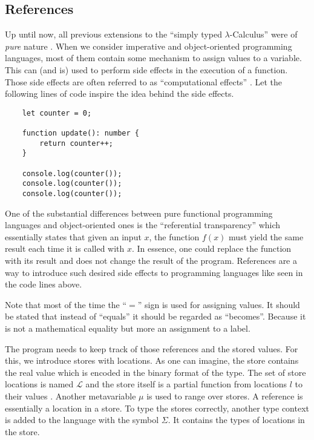 \subsection{References}

Up until now, all previous extensions to the ``simply
typed $\lambda$-Calculus'' were of \textit{pure} nature \cite{pierce2002ProgLang}.
When we consider imperative and object-oriented programming languages,
most of them contain some mechanism to assign values to a variable.
This can (and is) used to perform side effects in the execution
of a function. Those side effects are often referred to as 
``computational effects'' \cite{pierce2002ProgLang}. Let the
following lines of code inspire the idea behind the side effects.

\begin{verbatim}
    let counter = 0;

    function update(): number {
        return counter++;
    }

    console.log(counter());
    console.log(counter());
    console.log(counter());
\end{verbatim}

One of the substantial differences between pure functional programming
languages and object-oriented ones is the ``referential transparency''
which essentially states that given an input $x$, the function $f(x)$
must yield the same result each time it is called with $x$. In essence,
one could replace the function with its result and does not change
the result of the program. References are a way to introduce such
desired side effects to programming languages like seen in the
code lines above.

Note that most of the time the ``$=$'' sign is used for assigning values. It should be
stated that instead of ``equals'' it should be regarded as ``becomes''.
Because it is not a mathematical equality but more an assignment
to a label.

The program needs to keep track of those references and the stored values.
For this, we introduce stores with locations.
As one can imagine, the store contains the real value which is encoded
in the binary format of the type. The set of store locations is named $\mathcal{L}$
and the store itself is a partial function from locations $l$ to their values
\cite{pierce2002ProgLang}. Another metavariable $\mu$ is used to range
over stores. A reference is essentially a location in a store.
To type the stores correctly, another type context is added to the language
with the symbol $\Sigma$. It contains the types of locations in the store.

